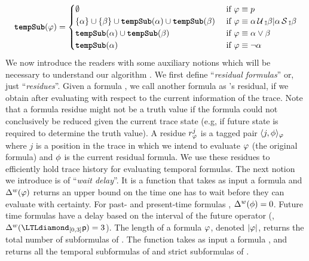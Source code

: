 \[
\textbf{\texttt{tempSub}}(\varphi) = \begin{cases}
\emptyset & \mbox{ if } \varphi \equiv p\\
\{\alpha\} \cup \{\beta\} \cup \textbf{\texttt{tempSub}}(\alpha) \cup \textbf{\texttt{tempSub}}(\beta) & \mbox{ if } \varphi\equiv\alpha\,\mathrm{\cal U}\,_\mathbb{I}\beta|\alpha\,\mathrm{\cal S}\,_\mathbb{I}\beta\\
\textbf{\texttt{tempSub}}(\alpha) \cup \textbf{\texttt{tempSub}}(\beta) & \mbox{ if } \varphi\equiv\alpha\vee\beta\\
\textbf{\texttt{tempSub}}(\alpha) & \mbox{ if }\varphi\equiv\neg\alpha
\end{cases}
\]
We now introduce the readers with some auxiliary notions which will be
necessary to understand our algorithm \monitor. We first define ``\emph{residual formulas}'' or, just ``\emph{residues}''.
Given a formula \policy, we call another formula \policyv as \policy's residual, if we obtain \policyv after evaluating \policy with respect to the current information of the trace.
Note that a formula residue might not be a truth value if the formula could not conclusively be reduced given the current trace state (e.g, if future state is required to determine the truth value).
A residue $r^j_{\varphi}$ is a tagged pair $\langle j, \phi \rangle_{\varphi}$ where $j$ is a position in the trace in which we intend to evaluate $\varphi$ (the original formula) and $\phi$ is the current residual formula. We use these residues to efficiently hold trace history for evaluating temporal formulas.
%
The next notion we introduce is of ``\emph{wait delay}''. It is a function \wdelay that takes as input a formula \policy and
$\Delta^w(\varphi)$ returns
an upper bound on the time one has to wait before they can evaluate \policy with certainty.
For past- and present-time formulas \policyv, $\Delta^w(\phi)=0$.
Future time formulas have a delay based on the interval of the future operator
(\eg, $\wdelay(\LTLdiamond_{[0,3]} \pred{p}) = 3$). The length of a formula $\varphi$, denoted $|\varphi|$, returns the total number of subformulas of \policy.
The function \tempSub takes as input a formula \policy, and returns all the temporal subformulas \policyv of \policy and strict subformulas of \policyv.



